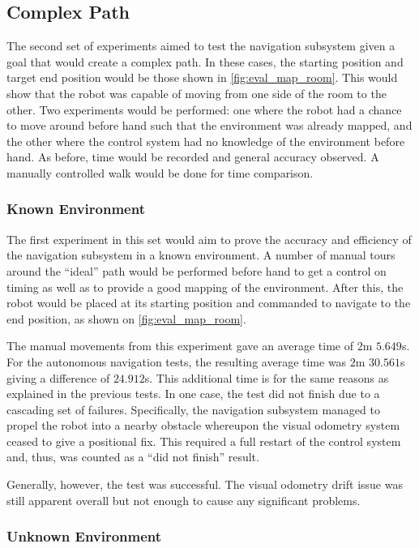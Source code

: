 \subsection{Complex Path}

The second set of experiments aimed to test the navigation subsystem given a goal that would create a complex path. In these cases, the starting position and target end position would be those shown in \autoref{fig:eval_map_room}. This would show that the robot was capable of moving from one side of the room to the other. Two experiments would be performed: one where the robot had a chance to move around before hand such that the environment was already mapped, and the other where the control system had no knowledge of the environment before hand. As before, time would be recorded and general accuracy observed. A manually controlled walk would be done for time comparison.

\subsubsection{Known Environment}

The first experiment in this set would aim to prove the accuracy and efficiency of the navigation subsystem in a known environment. A number of manual tours around the ``ideal'' path would be performed before hand to get a control on timing as well as to provide a good mapping of the environment. After this, the robot would be placed at its starting position and commanded to navigate to the end position, as shown on \autoref{fig:eval_map_room}.

The manual movements from this experiment gave an average time of $2$m $5.649$s. For the autonomous navigation tests, the resulting average time was $2$m $30.561$s giving a difference of $24.912$s. This additional time is for the same reasons as explained in the previous tests. In one case, the test did not finish due to a cascading set of failures. Specifically, the navigation subsystem managed to propel the robot into a nearby obstacle whereupon the visual odometry system ceased to give a positional fix. This required a full restart of the control system and, thus, was counted as a ``did not finish'' result.

Generally, however, the test was successful. The visual odometry drift issue was still apparent overall but not enough to cause any significant problems.

\subsubsection{Unknown Environment}

